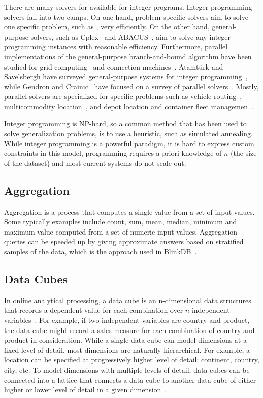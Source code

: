 \documentclass[11pt, oneside]{report}
\begin{document}
{There are many solvers for available for integer programs. Integer programming solvers fall into two camps. On one hand, problem-specific solvers aim to solve one specific problem, such as , very efficiently. On the other hand, general-purpose solvers, such as Cplex~\cite{cplex200711} and ABACUS~\cite{junger2000abacus}, aim to solve any integer programming instances with reasonable efficiency. Furthermore, parallel implementations of the general-purpose branch-and-bound algorithm have been studied for grid computing~\cite{mezmaz2007grid} and connection machines~\cite{eckstein1994parallel}. Atamt{\"u}rk and Savelsbergh have surveyed general-purpose systems for integer programming~\cite{atamturk2005integer}, while Gendron and Crainic~\cite{} have focused on a survey of parallel solvers~\cite{gendron1994parallel}. Mostly, parallel solvers are specialized for specific problems such as vehicle routing~\cite{ralphs2003parallel}, multicommodity location~\cite{gendron1997parallel}, and depot location and container fleet managemen~\cite{bourbeau2000branch}. 

Integer programming is NP-hard, so a common method that has been used to solve generalization problems, is to use a heuristic, such as simulated annealing. While integer programming is a powerful paradigm, it is hard to express custom constraints in this model, programming requires a priori knowledge of $n$ (the size of the dataset) and most current systems do not scale out.

\subsection{Aggregation}

Aggregation is a process that computes a single value from a set of input values. Some typically examples include count, sum, mean, median, minimum and maximum value computed from a set of numeric input values. Aggregation queries can be speeded up by giving approximate answers based on stratified samples of the data, which is the approach used in BlinkDB~\cite{agarwal2014blink}. 

\subsection{Data Cubes}
In online analytical processing, a data cube is an n-dimensional data structures that records a dependent value for each combination over $n$ independent variables~\cite{gray1997data}. For example, if two independent variables are country and product, the data cube might record a sales measure for each combination of country and product in consideration. While a single data cube can model dimensions at a fixed level of detail, most dimensions are naturally hierarchical. For example, a location can be specified at progressively higher level of detail: continent, country, city, etc. To model dimensions with multiple levels of detail, data cubes can be connected into a lattice that connects a data cube to another data cube of either higher or lower level of detail in a given dimension~\cite{stolte2008polaris}.

}
\end{document}
